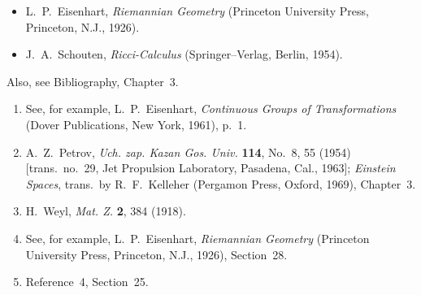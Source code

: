 

\begin{itemize}
  \item L.~P.~Eisenhart, \textit{Riemannian Geometry} (Princeton University
  Press, Princeton, N.J., 1926).

  \item J.~A.~Schouten, \textit{Ricci-Calculus} (Springer--Verlag, Berlin,
  1954).
\end{itemize}

Also, see Bibliography, Chapter~3.


\begin{enumerate}
  \item {}\label{ch6-ref-1}
  See, for example, L.~P.~Eisenhart, \textit{Continuous Groups of
  Transformations} (Dover Publications, New York, 1961), p.~1.

  \item {}\label{ch6-ref-2}
  A.~Z.~Petrov, \textit{Uch. zap. Kazan Gos. Univ.} \textbf{114}, No.~8,
  55 (1954) [trans.\ no.~29, Jet Propulsion Laboratory, Pasadena, Cal.,
  1963]; \textit{Einstein Spaces}, trans.\ by R.~F.~Kelleher (Pergamon
  Press, Oxford, 1969), Chapter~3.

  \item {}\label{ch6-ref-3}
  H.~Weyl, \textit{Mat. Z.} \textbf{2}, 384 (1918).

  \item {}\label{ch6-ref-4}
  See, for example, L.~P.~Eisenhart, \textit{Riemannian Geometry}
  (Princeton University Press, Princeton, N.J., 1926), Section~28.

  \item {}\label{ch6-ref-5}
  Reference~4, Section~25.
\end{enumerate}
